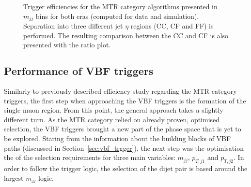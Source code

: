 \begin{figure}[htbp]
{    }
  \caption{Trigger efficiencies for the MTR category algorithms presented in $m_{jj}$ bins for both eras (computed for data and simulation). Separation into three different jet $\eta$ regions (CC, CF and FF) is performed. The resulting comparison between the CC and CF is also presented with the ratio plot.}
  \label{fig:metmht_test}
\end{figure}







\subsection{Performance of VBF triggers}
\label{sec:vbf_trigger_performance}

\hspace{10pt} Similarly to previously described efficiency study regarding the MTR category triggers, the first step when approaching the VBF triggers is the formation of the single muon region. From this point, the general approach takes a slightly different turn. As the MTR category relied on already proven, optimised selection, the VBF triggers brought a new part of the phase space that is yet to be explored. Staring from the information about the building blocks of VBF paths (discussed in Section~\ref{sec:vbf_trgger}), the next step was the optimisation the of the selection requirements for three main variables: $m_{jj}$, $p_{T,j1}$ and $p_{T,j2}$. In order to follow the trigger logic, the selection of the dijet pair is based around the largest $m_{jj}$ logic.

